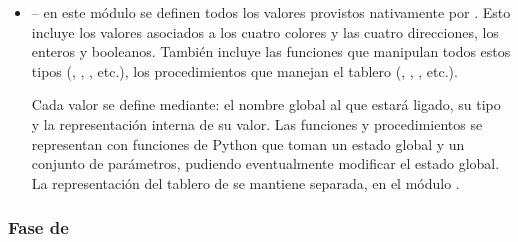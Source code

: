 \documentclass{article}
\begin{document}
\begin{itemize}
\item {} -- en este m\'odulo se definen todos los
valores provistos nativamente por \Gbs. Esto incluye los valores asociados a
los cua\-tro colores y las cuatro direcciones, los enteros y booleanos.
Tambi\'en incluye las funciones  que manipulan todos estos
tipos (, , , etc.), los procedimientos
que manejan el tablero (, , , etc.).

Cada valor  se define mediante: el nombre global al que
estar\'a li\-ga\-do, su tipo y la representaci\'on interna de su valor.
Las funciones y procedimientos  se representan con
funciones de Python que toman un estado global y un conjunto de
par\'ametros, pudiendo eventualmente modificar el estado global.
La representaci\'on del tablero de \Gbs se mantiene separada, en
el m\'odulo .
\end{itemize}

\subsubsection{Fase de }
\end{document}
